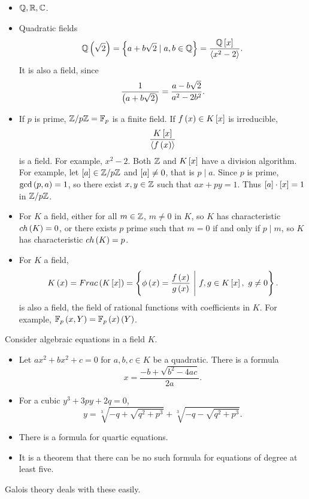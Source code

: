 \begin{example1}
\hfill
\begin{itemize}
\item $ \Q, \R, \C $.
\item Quadratic fields
$$ \Q\rb{\sqrt{2}} = \cb{a + b\sqrt{2} \mid a, b \in \Q} = \dfrac{\Q\sb{x}}{\ab{x^2 - 2}}. $$
It is also a field, since
$$ \dfrac{1}{\rb{a + b\sqrt{2}}} = \dfrac{a - b\sqrt{2}}{a^2 - 2b^2}. $$
\item If $ p $ is prime, $ \Z / p\Z = \F_p $ is a finite field. If $ f\rb{x} \in K\sb{x} $ is irreducible,
$$ \dfrac{K\sb{x}}{\ab{f\rb{x}}} $$
is a field. For example, $ x^2 - 2 $. Both $ \Z $ and $ K\sb{x} $ have a division algorithm. For example, let $ \sb{a} \in \Z / p\Z $ and $ \sb{a} \ne 0 $, that is $ p \mid a $. Since $ p $ is prime, $ \gcd\rb{p, a} = 1 $, so there exist $ x, y \in \Z $ such that $ ax + py = 1 $. Thus $ \sb{a} \cdot \sb{x} = 1 $ in $ \Z / p\Z $.
\item For $ K $ a field, either for all $ m \in \Z $, $ m \ne 0 $ in $ K $, so $ K $ has characteristic $ ch\rb{K} = 0 $, or there exists $ p $ prime such that $ m = 0 $ if and only if $ p \mid m $, so $ K $ has characteristic $ ch\rb{K} = p $.
\item For $ K $ a field,
$$ K\rb{x} = Frac\rb{K\sb{x}} = \cb{\phi\rb{x} = \dfrac{f\rb{x}}{g\rb{x}} \ \Bigg| \ f, g \in K\sb{x}, \ g \ne 0}. $$
is also a field, the field of rational functions with coefficients in $ K $. For example, $ \F_p\rb{x, Y} = \F_p\rb{x}\rb{Y} $.
\end{itemize}
\end{example1}

\begin{example1}
Consider algebraic equations in a field $ K $.
\begin{itemize}
\item Let $ ax^2 + bx^2 + c = 0 $ for $ a, b, c \in K $ be a quadratic. There is a formula
$$ x = \dfrac{-b + \sqrt{b^2 - 4ac}}{2a}. $$
\item For a cubic $ y^3 + 3py + 2q = 0 $,
$$ y = \sqrt[3]{-q + \sqrt{q^2 + p^3}} + \sqrt[3]{-q - \sqrt{q^2 + p^3}}. $$
\item There is a formula for quartic equations.
\item It is a theorem that there can be no such formula for equations of degree at least five.
\end{itemize}
Galois theory deals with these easily.
\end{example1}

